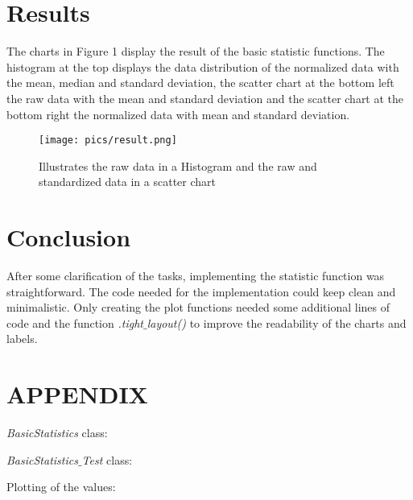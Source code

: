 \documentclass[10pt, a4paper, twocolumn]{article} %
\begin{document}
\section{Results}
The charts in Figure 1 display the result of the basic statistic functions. The histogram at the top displays the data distribution of the normalized data with the mean, median and standard deviation, the scatter chart at the bottom left the raw data with the mean and standard deviation and the scatter chart at the bottom right the normalized data with mean and standard deviation. 

\begin{figure}[htbp] %
  \centering
  \texttt{[image: pics/result.png]}
  \caption{Illustrates the raw data in a Histogram and the raw and standardized data in a scatter chart}
  \label{fig:fibonacciPlot}
\end{figure}


\section{Conclusion}
After some clarification of the tasks, implementing the statistic function was straightforward. The code needed for the implementation could keep clean and minimalistic. Only creating the plot functions needed some additional lines of code and the function \textit{.tight$\_$layout()} to improve the readability of the charts and labels. 

\section*{APPENDIX}

\textit{BasicStatistics} class: 

\newpage

\textit{BasicStatistics$\_$Test} class: 

\newpage

Plotting of the values:






\printbibliography[title={Bibliography}] %

\end{document}
